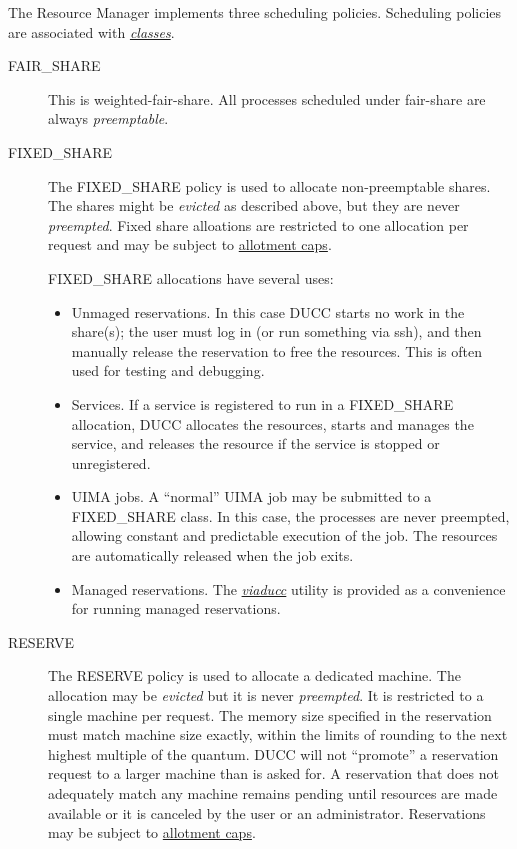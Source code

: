     The Resource Manager implements three scheduling policies. Scheduling policies are
    associated with \hyperref[sec:rm.job-classes]{\em classes}.
    \begin{description}
        \item[FAIR\_SHARE] This is weighted-fair-share.  All processes scheduled under
           fair-share are always {\em preemptable}.

        \item[FIXED\_SHARE] The FIXED\_SHARE policy is used to allocate non-preemptable
          shares.  The shares might be {\em evicted} as described above, but they are 
          never {\em preempted}.  Fixed share alloations are restricted to one
          allocation per request and may be subject to \hyperref[sec:rm.allotment]{allotment caps}.

          FIXED\_SHARE allocations have several uses:
          \begin{itemize}
            \item Unmaged reservations.  In this case DUCC starts no work in the share(s); the user must
              log in (or run something via ssh), and then manually release the reservation to free
              the resources.  This is often used for testing and debugging.
            \item Services.  If a service is registered to run in a FIXED\_SHARE allocation,
              DUCC allocates the resources, starts and manages the service, and releases the
              resource if the service is stopped or unregistered.
            \item UIMA jobs.  A ``normal'' UIMA job may be submitted to a FIXED\_SHARE
              class.  In this case, the processes are never preempted, allowing constant and
              predictable execution of the job.  The resources are automatically released when
              the job exits.
            \item Managed reservations.  The \hyperref[sec:cli.viaducc]{\em viaducc} utility is provided 
              as a convenience for running managed reservations.
          \end{itemize}                    
          
        \item[RESERVE] The RESERVE policy is used to allocate a dedicated machine.
          The allocation may be {\em evicted} but it is never {\em preempted}. It is
          restricted to a single machine per request.  The memory size
          specified in the reservation must match machine size
          exactly, within the limits of rounding to the next highest multiple of the
          quantum.  DUCC will not ``promote'' a reservation request to a larger machine
          than is asked for.  A reservation that does not adequately match any
          machine remains pending until resources are made available or it is 
          canceled by the user or an administrator. Reservations may be
          subject to \hyperref[sec:rm.allotment]{allotment caps}.

    \end{description}
    
